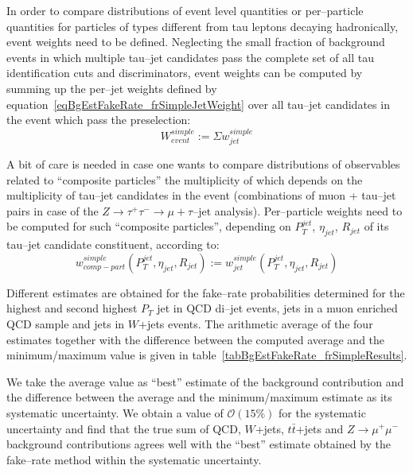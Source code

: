In order to compare distributions of event level quantities or per--particle
quantities for particles of types different from tau leptons decaying
hadronically, event weights need to be defined.  Neglecting the small fraction
of background events in which multiple tau--jet candidates pass the complete set
of all tau identification cuts and discriminators, event weights can be computed
by summing up the per--jet weights defined by
equation~\ref{eqBgEstFakeRate_frSimpleJetWeight} over all tau--jet candidates in
the event which pass the preselection:
\begin{equation}
W_{event}^{simple} := \Sigma w_{jet}^{simple}
\label{eqBgEstFakeRate_frSimpleEventWeight}
\end{equation}

A bit of care is needed in case one wants to compare distributions of
observables related to ``composite particles'' the multiplicity of which depends
on the multiplicity of tau--jet candidates in the event (\eg combinations of
muon + tau--jet pairs in case of the $Z \rightarrow \tau^{+} \tau^{-}
\rightarrow \mu + \tau\mbox{--jet}$ analysis).  Per--particle weights need to be
computed for such ``composite particles'', depending on $P_{T}^{jet}$,
$\eta_{jet}$, $R_{jet}$ of its tau--jet candidate constituent, according to:
\begin{equation}
w_{comp-part}^{simple} \left( P_{T}^{jet}, \eta_{jet}, R_{jet} \right) := 
  w_{jet}^{simple} \left( P_{T}^{jet}, \eta_{jet}, R_{jet} \right)
\label{eqBgEstFakeRate_frSimpleCompositeParticleWeight}
\end{equation}

Different estimates are obtained for the fake--rate probabilities determined for
the highest and second highest $P_{T}$ jet in QCD di--jet events, jets in a muon
enriched QCD sample and jets in $W$+jets events.  The arithmetic average of the
four estimates together with the difference between the computed average and the
minimum/maximum value is given in table~\ref{tabBgEstFakeRate_frSimpleResults}.

We take the average value as ``best'' estimate of the background contribution
and the difference between the average and the minimum/maximum estimate as its
systematic uncertainty.  We obtain a value of $\mathcal{O} \left( 15 \% \right)$
for the systematic uncertainty and find that the true sum of QCD, $W$+jets,
$t\bar{t}$+jets and $Z \rightarrow \mu^{+} \mu^{-}$ background contributions
agrees well with the ``best'' estimate obtained by the fake--rate method within
the systematic uncertainty.

